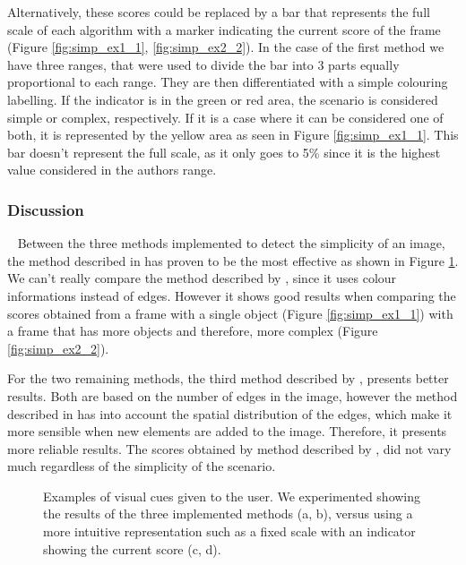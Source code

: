 Alternatively, these scores could be replaced by a bar that represents the full scale of each algorithm with a marker indicating the current score of the frame (Figure \ref{fig:simp_ex1_1}, \ref{fig:simp_ex2_2}).
In the case of the first method \cite{luo2008photo} we have three ranges, that were used to divide the bar into 3 parts equally proportional to each range. They are then differentiated with a simple colouring labelling. If the indicator is in the green or red area, the scenario is considered simple or complex, respectively. If it is a case where it can be considered one of both, it is represented by the yellow area as seen in Figure \ref{fig:simp_ex1_1}. This bar doesn't represent the full scale, as it only goes to 5\% since it is the highest value considered in the authors range.

\subsubsection{Discussion}\
\label{subsub:simp_disc}
Between the three methods implemented to detect the simplicity of an image, the method described in \cite{ke2006design} has proven to be the most effective as shown in Figure \ref{fig:simp_ex}. We can't really compare the method described by \citeauthor{luo2008photo} \cite{luo2008photo}, since it uses colour informations instead of edges. However it shows good results when comparing the scores obtained from a frame with a single object (Figure \ref{fig:simp_ex1_1}) with a frame that has more objects and therefore, more complex (Figure \ref{fig:simp_ex2_2}).

For the two remaining methods, the third method described by \citeauthor{ke2006design}, presents better results. Both are based on the number of edges in the image, however the method described in \cite{ke2006design} has into account the spatial distribution of the edges, which make it more sensible when new elements are added to the image. Therefore, it presents more reliable results. The scores obtained by method described by \citeauthor{kaoautomatic} \cite{kaoautomatic}, did not vary much regardless of the simplicity of the scenario.

\begin{figure}[htb]
	\centering
  	\caption{Examples of visual cues given to the user. We experimented showing the results of the three implemented methods (a, b), versus using a more intuitive representation such as a fixed scale with an indicator showing the current score (c, d).}
	\label{fig:simp_ex}
\end{figure}

